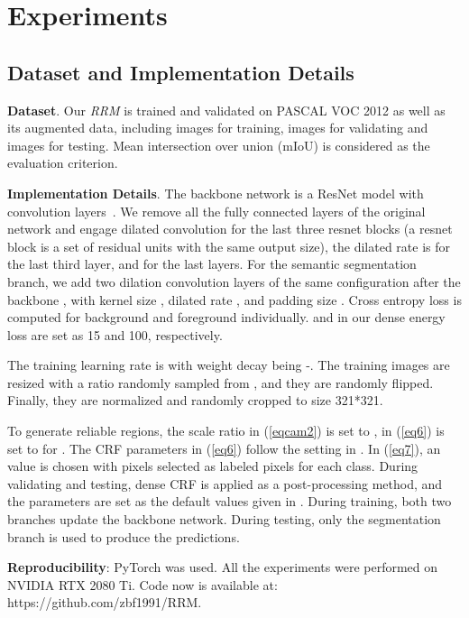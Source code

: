 \documentclass[letterpaper]{article} \usepackage{aaai20}  \usepackage{times}  \usepackage{helvet} \usepackage{courier}  \usepackage[hyphens]{url}  \usepackage{graphicx} \urlstyle{rm} \def\UrlFont{\rm}  \usepackage{graphicx}  \frenchspacing  \setlength{\pdfpagewidth}{8.5in}  \setlength{\pdfpageheight}{11in}
\begin{document}
\section{Experiments}
\subsection{Dataset and Implementation Details}\label{sec4}

\textbf{Dataset}. Our \emph{RRM} is trained and validated on PASCAL VOC 2012 \cite{everingham2010pascal} as well as its augmented data, including  images for training,  images for validating and  images for testing. Mean intersection over union (mIoU) is considered as the evaluation criterion.

\noindent\textbf{Implementation Details}. The backbone network is a ResNet model with  convolution layers~\cite{wu2019wider}. We remove all the fully connected layers of the original network and engage dilated convolution for the last three resnet blocks (a resnet block is a set of residual units with the same output size), the dilated rate is  for the last third layer, and  for the last  layers. For the semantic segmentation branch, we add two dilation convolution layers of the same configuration after the backbone \cite{wu2019wider}, with kernel size , dilated rate , and padding size . Cross entropy loss is computed for background and foreground individually.  and  in our dense energy loss are set as 15 and 100, respectively. 

The training learning rate is  with weight decay being -. The training images are resized with a ratio randomly sampled from , and they are randomly flipped. Finally, they are normalized and randomly cropped to size 321*321.

To generate reliable regions, the scale ratio in (\ref{eqcam2}) is set to ,  in (\ref{eq6}) is set to  for . The CRF parameters in (\ref{eq6}) follow the setting in \cite{ahn2018learning}. In (\ref{eq7}), an  value is chosen with  pixels selected as labeled pixels for each class.  During validating and testing, dense CRF is applied as a post-processing method, and the parameters are set as the default values given in \cite{huang2018weakly}.
During training, both two branches update the backbone network. During testing, only the segmentation branch is used to produce the predictions.

\noindent\textbf{Reproducibility}: PyTorch \cite{paszke2017automatic} was used. All the experiments were performed on NVIDIA RTX 2080 Ti. Code now is available at: https://github.com/zbf1991/RRM.
\end{document}
